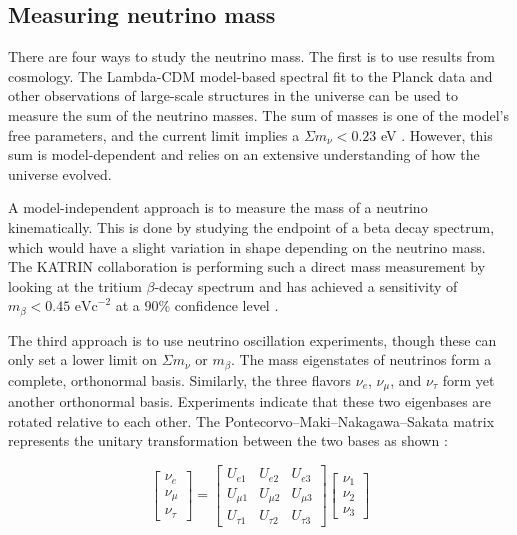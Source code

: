 \subsection{Measuring neutrino mass}
There are four ways to study the neutrino mass. The first is to use results from cosmology. The Lambda-CDM model-based spectral fit to the Planck data and other observations of large-scale structures in the universe can be used to measure the sum of the neutrino masses. The sum of masses is one of the model's free parameters, and the current limit implies a $\Sigma m_\nu<0.23$ eV \cite{Planck_2015fie}. However, this sum is model-dependent and relies on an extensive understanding of how the universe evolved. 

A model-independent approach is to measure the mass of a neutrino kinematically. This is done by studying the endpoint of a beta decay spectrum, which would have a slight variation in shape depending on the neutrino mass. The KATRIN collaboration is performing such a direct mass measurement by looking at the tritium $\beta$-decay spectrum and has achieved a sensitivity of $m_\beta < 0.45 \text{ eVc}^{-2}$ at a $90\%$ confidence level \cite{katrin2025}.


The third approach is to use neutrino oscillation experiments, though these can only set a lower limit on $\Sigma m_\nu$ or $m_\beta$. The mass eigenstates of neutrinos form a complete, orthonormal basis. Similarly, the three flavors $\nu_e$, $\nu_\mu$, and $\nu_\tau$ form yet another orthonormal basis. Experiments indicate that these two eigenbases are rotated relative to each other. The Pontecorvo–Maki–Nakagawa–Sakata matrix represents the unitary transformation between the two bases as shown \cite{Maki_1962mu}:

\begin{equation}\label{pmns_matrix}
\begin{bmatrix} \nu_e \\ \nu_\mu \\ \nu_\tau \end{bmatrix} = \begin{bmatrix} U_{e1} & U_{e2} & U_{e3}\\ U_{\mu 1} & U_{\mu 2} & U_{\mu 3} \\ U_{\tau 1} & U_{\tau 2} & U_{\tau 3} \end{bmatrix} \begin{bmatrix} \nu_1 \\ \nu_2 \\ \nu_3 \end{bmatrix}
\end{equation}

